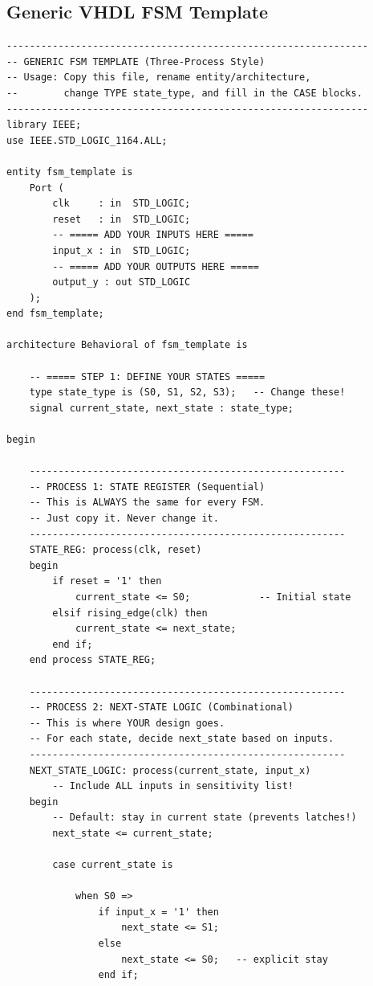 \documentclass[12pt,a4paper]{article}
\begin{document}
\subsection{Generic VHDL FSM Template}

{\small
\begin{verbatim}
---------------------------------------------------------------
-- GENERIC FSM TEMPLATE (Three-Process Style)
-- Usage: Copy this file, rename entity/architecture,
--        change TYPE state_type, and fill in the CASE blocks.
---------------------------------------------------------------
library IEEE;
use IEEE.STD_LOGIC_1164.ALL;

entity fsm_template is
    Port (
        clk     : in  STD_LOGIC;
        reset   : in  STD_LOGIC;
        -- ===== ADD YOUR INPUTS HERE =====
        input_x : in  STD_LOGIC;
        -- ===== ADD YOUR OUTPUTS HERE =====
        output_y : out STD_LOGIC
    );
end fsm_template;

architecture Behavioral of fsm_template is

    -- ===== STEP 1: DEFINE YOUR STATES =====
    type state_type is (S0, S1, S2, S3);   -- Change these!
    signal current_state, next_state : state_type;

begin

    -------------------------------------------------------
    -- PROCESS 1: STATE REGISTER (Sequential)
    -- This is ALWAYS the same for every FSM.
    -- Just copy it. Never change it.
    -------------------------------------------------------
    STATE_REG: process(clk, reset)
    begin
        if reset = '1' then
            current_state <= S0;            -- Initial state
        elsif rising_edge(clk) then
            current_state <= next_state;
        end if;
    end process STATE_REG;

    -------------------------------------------------------
    -- PROCESS 2: NEXT-STATE LOGIC (Combinational)
    -- This is where YOUR design goes.
    -- For each state, decide next_state based on inputs.
    -------------------------------------------------------
    NEXT_STATE_LOGIC: process(current_state, input_x)
        -- Include ALL inputs in sensitivity list!
    begin
        -- Default: stay in current state (prevents latches!)
        next_state <= current_state;

        case current_state is

            when S0 =>
                if input_x = '1' then
                    next_state <= S1;
                else
                    next_state <= S0;   -- explicit stay
                end if;


\end{verbatim}}
\end{document}
